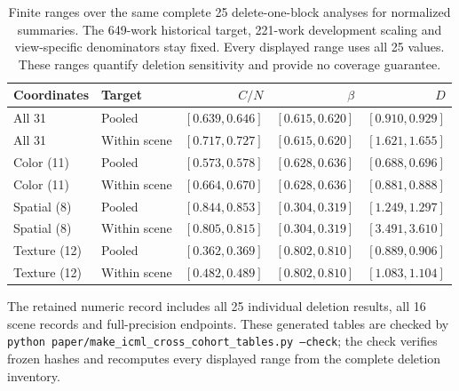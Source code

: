 \begin{table}[!htbp]
\caption{Finite ranges over the same complete 25 delete-one-block analyses for normalized summaries. The 649-work historical target, 221-work development scaling and view-specific denominators stay fixed. Every displayed range uses all 25 values. These ranges quantify deletion sensitivity and provide no coverage guarantee.}
\label{tab:cross-cohort-delete-normalized}
\centering\small\setlength{\tabcolsep}{4pt}
\begin{tabularx}{\linewidth}{@{}Xlrrr@{}}\toprule
Coordinates & Target & $C/N$ & $\beta$ & $D$\\\midrule
All 31 & Pooled & $[0.639, 0.646]$ & $[0.615, 0.620]$ & $[0.910, 0.929]$\\
All 31 & Within scene & $[0.717, 0.727]$ & $[0.615, 0.620]$ & $[1.621, 1.655]$\\
\addlinespace[2pt]
Color (11) & Pooled & $[0.573, 0.578]$ & $[0.628, 0.636]$ & $[0.688, 0.696]$\\
Color (11) & Within scene & $[0.664, 0.670]$ & $[0.628, 0.636]$ & $[0.881, 0.888]$\\
\addlinespace[2pt]
Spatial (8) & Pooled & $[0.844, 0.853]$ & $[0.304, 0.319]$ & $[1.249, 1.297]$\\
Spatial (8) & Within scene & $[0.805, 0.815]$ & $[0.304, 0.319]$ & $[3.491, 3.610]$\\
\addlinespace[2pt]
Texture (12) & Pooled & $[0.362, 0.369]$ & $[0.802, 0.810]$ & $[0.889, 0.906]$\\
Texture (12) & Within scene & $[0.482, 0.489]$ & $[0.802, 0.810]$ & $[1.083, 1.104]$\\
\bottomrule\end{tabularx}\end{table}
\FloatBarrier
The retained numeric record includes all 25 individual deletion results, all 16 scene records and full-precision endpoints. These generated tables are checked by \texttt{python paper/make\_icml\_cross\_cohort\_tables.py --check}; the check verifies frozen hashes and recomputes every displayed range from the complete deletion inventory.
